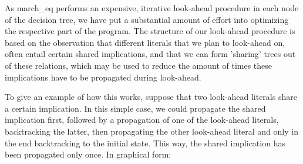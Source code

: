 \documentclass[twoside,11pt]{article}
\begin{document}
As {\sf march\_eq} performs an expensive, iterative look-ahead procedure in each node of the decision tree,
we have put a substantial amount of effort into optimizing the respective part of the program. The
structure of our look-ahead procedure is based on the observation that different literals that we
plan to look-ahead on, often entail certain shared implications, and that we can form 'sharing'
trees out of these relations, which may be used to reduce the amount of times these implications 
have to be propagated during look-ahead.

To give an example of how this works, suppose that two look-ahead literals share a certain implication. 
In this simple case, we could propagate the shared implication first, followed by a propagation of one
of the look-ahead literals, backtracking the latter, then propagating the other look-ahead literal and 
only in the end backtracking to the initial state. This way, the shared implication has been propagated
only once. In graphical form:
\end{document}
